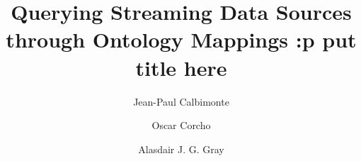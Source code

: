 \documentclass[preprint,5p,twocolumn,12pt]{elsarticle}
\begin{document}
\begin{frontmatter}



\title{Querying Streaming Data Sources through Ontology Mappings :p put title here}


\author[rvt]{Jean-Paul Calbimonte}
\author[rvt]{Oscar Corcho}
\author[els]{Alasdair J. G. Gray}


\address[rvt]{Ontology Engineering Group, Departamento de Inteligencia Artificial, \\ 
Facultad de Inform\'{a}tica, Universidad Polit\'{e}cnica de Madrid,\\ Campus de Montegancedo s/n 28660, Boadilla del Monte, Spain\\}
\address[els]{School of Computer Science, The University of Manchester,\\
Oxford Road, Manchester M13 9PL, United Kingdom}


\end{frontmatter}
\end{document}
